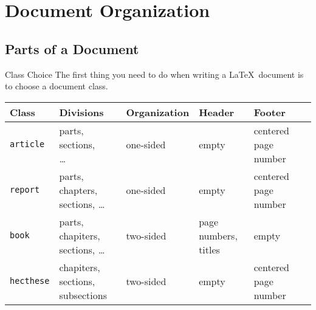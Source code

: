 
\section{Document Organization}

\subsection{Parts of a Document}

\begin{frame}[c]{Class Choice}
	The first thing you need to do when writing a \LaTeX\ document is to choose a document class.
	
	\begin{table}[fragile,c]
		\begin{tabularx}{\textwidth}{lllll}
			\arrayrulecolor{grisPrimaire!40}\hline\hline
			\textbf{Class} & \textbf{Divisions} & \textbf{Organization} & \textbf{Header} &	\textbf{Footer} \\
			\hline
			\texttt{article}			&	\makecell{parts, sections,\\ \ldots}				&	one-sided		&	empty			&	centered page number \\
			\texttt{report}				&	\makecell{parts, chapters, \\ sections, \ldots}	&	one-sided		&	empty			&	centered page number \\
			\texttt{book}				&	\makecell{parts, chapiters, \\ sections, \ldots}	&	two-sided	&
			\makecell{page numbers, \\ titles}	&	empty \\
			\texttt{hecthese}	&	\makecell{chapiters, sections, \\ subsections}		&	two-sided	&
			empty			&	centered page number \\
			\hline\hline
		\end{tabularx}
	\end{table}
\end{frame}

